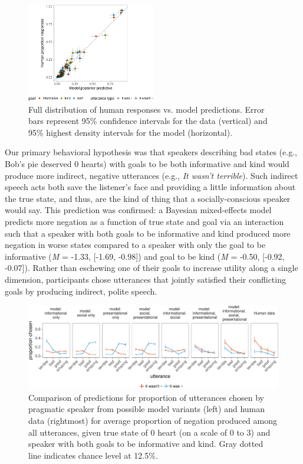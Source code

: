 \documentclass[9pt,twocolumn,twoside,lineno]{main_class_file}
\begin{document}
\begin{figure}[!h]
\includegraphics[width=0.5\textwidth]{fig/variance-1} \caption{Full distribution of human responses vs. model predictions. Error bars represent 95\% confidence intervals for the data (vertical) and 95\% highest density intervals for the model (horizontal).}\label{fig:variance}
\end{figure}

Our primary behavioral hypothesis was that speakers describing bad
states (e.g., Bob's pie deserved 0 hearts) with goals to be both
informative and kind would produce more indirect, negative utterances
(e.g., \emph{It wasn't terrible}). Such indirect speech acts both
save the listener's face and providing a little information about the
true state, and thus, are the kind of thing that a socially-conscious speaker would say. 
This prediction was confirmed: a Bayesian mixed-effects
model predicts more negation as a function of true state and goal via
an interaction such that a speaker with both goals to be informative and
kind produced more negation in worse states compared to a speaker with
only the goal to be informative (\emph{M} = -1.33, {[}-1.69, -0.98{]})
and goal to be kind (\emph{M} = -0.50, {[}-0.92, -0.07{]}). Rather than
eschewing one of their goals to increase utility along a single
dimension, participants chose utterances that jointly satisfied their
conflicting goals by producing indirect, polite speech.

\begin{figure}[!h]
\includegraphics[width=\textwidth]{fig/comparison-1} \caption{Comparison of predictions for proportion of utterances chosen by pragmatic speaker from possible model variants (left) and human data (rightmost) for average proportion of negation produced among all utterances, given true state of 0 heart (on a scale of 0 to 3) and speaker with both goals to be informative and kind. Gray dotted line indicates chance level at 12.5\%.}\label{fig:comparison}
\end{figure}
\end{document}
